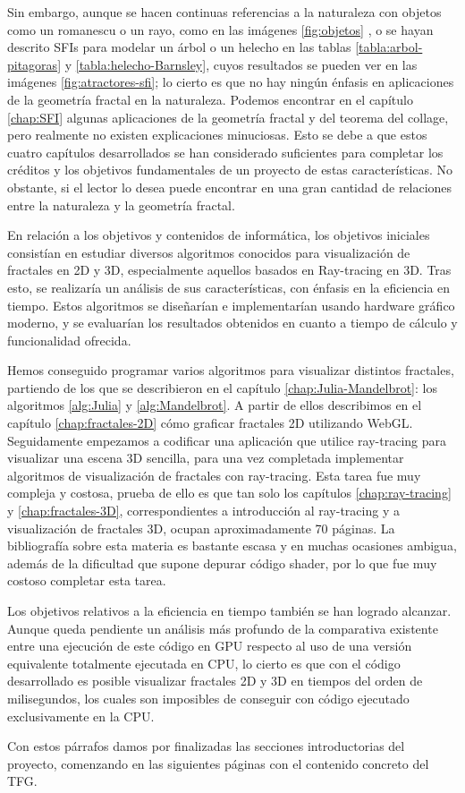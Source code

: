 Sin embargo, aunque se hacen continuas referencias a la naturaleza con objetos como un romanescu o un rayo, como en las imágenes \ref{fig:objetos} , o se hayan descrito SFIs para modelar un árbol o un helecho en las tablas \ref{tabla:arbol-pitagoras} y \ref{tabla:helecho-Barnsley}, cuyos resultados se pueden ver en las imágenes \ref{fig:atractores-sfi}; lo cierto es que no hay ningún énfasis en aplicaciones de la geometría fractal en la naturaleza. Podemos encontrar en el capítulo \ref{chap:SFI} algunas aplicaciones de la geometría fractal y del teorema del collage, pero realmente no existen explicaciones minuciosas. Esto se debe a que estos cuatro capítulos desarrollados se han considerado suficientes para completar los créditos y los objetivos fundamentales de un proyecto de estas características. No obstante, si el lector lo desea puede encontrar en \cite{Mandelbrot} una gran cantidad de relaciones entre la naturaleza y la geometría fractal.

En relación a los objetivos y contenidos de informática, los objetivos iniciales consistían en estudiar diversos algoritmos conocidos para visualización de fractales en 2D y 3D, especialmente aquellos basados en Ray-tracing en 3D. Tras esto, se realizaría un análisis de sus características, con énfasis en la eficiencia en tiempo. Estos algoritmos se diseñarían e implementarían usando hardware gráfico moderno, y se evaluarían los resultados obtenidos en cuanto a tiempo de cálculo y funcionalidad ofrecida.

Hemos conseguido programar varios algoritmos para visualizar distintos fractales, partiendo de los que se describieron en el capítulo \ref{chap:Julia-Mandelbrot}: los algoritmos \ref{alg:Julia} y \ref{alg:Mandelbrot}. A partir de ellos describimos en el capítulo \ref{chap:fractales-2D} cómo graficar fractales 2D utilizando WebGL. Seguidamente empezamos a codificar una aplicación que utilice ray-tracing para visualizar una escena 3D sencilla, para una vez completada implementar algoritmos de visualización de fractales con ray-tracing. Esta tarea fue muy compleja y costosa, prueba de ello es que tan solo los capítulos \ref{chap:ray-tracing} y \ref{chap:fractales-3D}, correspondientes a introducción al ray-tracing y a visualización de fractales 3D, ocupan aproximadamente 70 páginas. La bibliografía sobre esta materia es bastante escasa y en muchas ocasiones ambigua, además de la dificultad que supone depurar código shader, por lo que fue muy costoso completar esta tarea.

Los objetivos relativos a la eficiencia en tiempo también se han logrado alcanzar. Aunque queda pendiente un análisis más profundo de la comparativa existente entre una ejecución de este código en GPU respecto al uso de una versión equivalente totalmente ejecutada en CPU, lo cierto es que con el código desarrollado es posible visualizar fractales 2D y 3D en tiempos del orden de milisegundos, los cuales son imposibles de conseguir con código ejecutado exclusivamente en la CPU.

Con estos párrafos damos por finalizadas las secciones introductorias del proyecto, comenzando en las siguientes páginas con el contenido concreto del TFG.